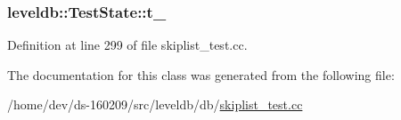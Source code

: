 \subsubsection[{t\+\_\+}]{ leveldb\+::\+Test\+State\+::t\+\_\+}\label{classleveldb_1_1_test_state_a090fd0c59fb141c4843511b4020f05e9}


Definition at line 299 of file skiplist\+\_\+test.\+cc.



The documentation for this class was generated from the following file\+:\begin{DoxyCompactItemize}
\item 
/home/dev/ds-\/160209/src/leveldb/db/\hyperlink{skiplist__test_8cc}{skiplist\+\_\+test.\+cc}\end{DoxyCompactItemize}
